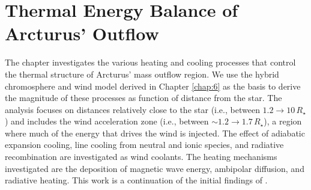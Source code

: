 \chapter{Thermal Energy Balance of Arcturus' Outflow}
\label{chap:7}

The chapter investigates the various heating and cooling processes that control the thermal structure of Arcturus' mass outflow region. We use the hybrid chromosphere and wind model derived in Chapter \ref{chap:6} as the basis to derive the magnitude of these processes as function of distance from the star. The analysis focuses on distances relatively close to the star (i.e., between $1.2\rightarrow 10\,R_{\star}$) and includes the wind acceleration zone (i.e., between $\sim 1.2\rightarrow 1.7\,R_{\star}$), a region where much of the energy that drives the wind is injected. The effect of adiabatic expansion cooling, line cooling from neutral and ionic species, and radiative recombination are investigated as wind coolants. The heating mechanisms investigated are the deposition of magnetic wave energy, ambipolar diffusion, and radiative heating. This work is a continuation of the initial findings of \cite{ogorman_2011}.

\pagebreak

